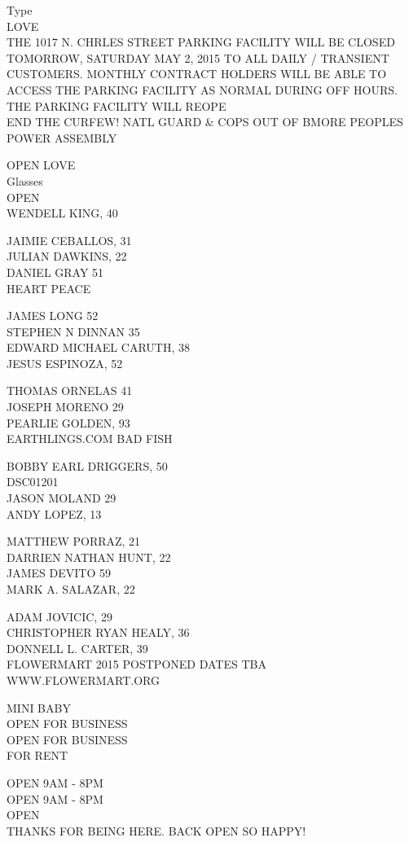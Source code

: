 \documentclass[10pt,letterpaper]{article}
\begin{document}
Type\\
LOVE\\
THE 1017 N. CHRLES STREET PARKING FACILITY WILL BE CLOSED TOMORROW, SATURDAY MAY 2, 2015 TO ALL DAILY / TRANSIENT CUSTOMERS.  MONTHLY CONTRACT HOLDERS WILL BE ABLE TO ACCESS THE PARKING FACILITY AS NORMAL DURING OFF HOURS.  THE PARKING FACILITY WILL REOPE\\
END THE CURFEW!  NATL GUARD \& COPS OUT OF BMORE PEOPLES POWER ASSEMBLY

OPEN LOVE\\
Glasses\\
OPEN\\
WENDELL KING, 40

JAIMIE CEBALLOS, 31\\
JULIAN DAWKINS, 22\\
DANIEL GRAY 51\\
HEART PEACE

JAMES LONG 52\\
STEPHEN N DINNAN 35\\
EDWARD MICHAEL CARUTH, 38\\
JESUS ESPINOZA, 52

THOMAS ORNELAS 41\\
JOSEPH MORENO 29\\
PEARLIE GOLDEN, 93\\
EARTHLINGS.COM BAD FISH

BOBBY EARL DRIGGERS, 50\\
DSC01201\\
JASON MOLAND 29\\
ANDY LOPEZ, 13

MATTHEW PORRAZ, 21\\
DARRIEN NATHAN HUNT, 22\\
JAMES DEVITO 59\\
MARK A. SALAZAR, 22

ADAM JOVICIC, 29\\
CHRISTOPHER RYAN HEALY, 36\\
DONNELL L. CARTER, 39\\
FLOWERMART 2015 POSTPONED DATES TBA WWW.FLOWERMART.ORG

MINI BABY\\
OPEN FOR BUSINESS\\
OPEN FOR BUSINESS\\
FOR RENT

OPEN 9AM {-} 8PM\\
OPEN 9AM {-} 8PM\\
OPEN\\
THANKS FOR BEING HERE.  BACK OPEN SO HAPPY!
\end{document}
